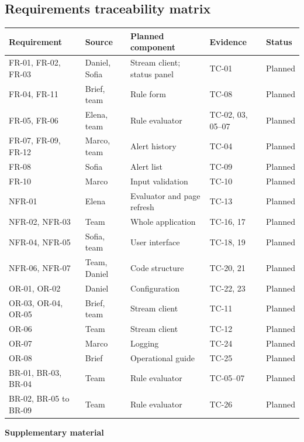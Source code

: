 \documentclass[10pt,a4paper]{article}
\newcommand{\head}[1]{\textbf{\color{courseblue}#1}}
\begin{document}
\subsection{Requirements traceability matrix}
\begin{longtable}{@{}L{28mm}L{28mm}L{40mm}L{30mm}L{20mm}@{}}
\toprule \head{Requirement} & \head{Source} & \head{Planned component} & \head{Evidence} & \head{Status}\\ \midrule \endhead
FR-01, FR-02, FR-03 & Daniel, Sofia & Stream client; status panel & TC-01 & Planned\\
FR-04, FR-11 & Brief, team & Rule form & TC-08 & Planned\\
FR-05, FR-06 & Elena, team & Rule evaluator & TC-02, 03, 05--07 & Planned\\
FR-07, FR-09, FR-12 & Marco, team & Alert history & TC-04 & Planned\\
FR-08 & Sofia & Alert list & TC-09 & Planned\\
FR-10 & Marco & Input validation & TC-10 & Planned\\
NFR-01 & Elena & Evaluator and page refresh & TC-13 & Planned\\
NFR-02, NFR-03 & Team & Whole application & TC-16, 17 & Planned\\
NFR-04, NFR-05 & Sofia, team & User interface & TC-18, 19 & Planned\\
NFR-06, NFR-07 & Team, Daniel & Code structure & TC-20, 21 & Planned\\
OR-01, OR-02 & Daniel & Configuration & TC-22, 23 & Planned\\
OR-03, OR-04, OR-05 & Brief, team & Stream client & TC-11 & Planned\\
OR-06 & Team & Stream client & TC-12 & Planned\\
OR-07 & Marco & Logging & TC-24 & Planned\\
OR-08 & Brief & Operational guide & TC-25 & Planned\\
BR-01, BR-03, BR-04 & Team & Rule evaluator & TC-05--07 & Planned\\
BR-02, BR-05 to BR-09 & Team & Rule evaluator & TC-26 & Planned\\
\bottomrule
\end{longtable}

\appendix
\clearpage
{}
{\Large\bfseries\color{courseblue} Supplementary material\par}
\end{document}
